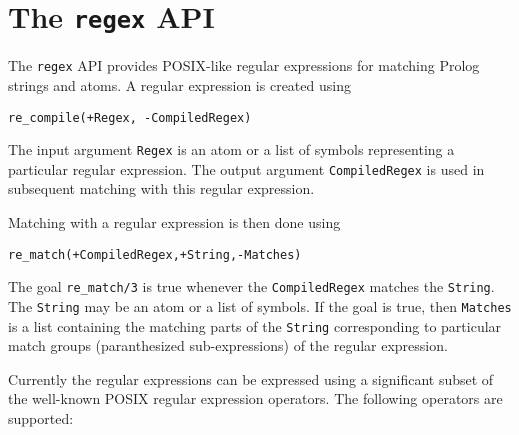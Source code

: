 \documentclass{book}
\begin{document}
\section{The \texttt{regex} API}
\label{sec:regex}

The \texttt{regex} API provides POSIX-like regular expressions for
matching Prolog strings and atoms. A regular expression is created
using
\begin{verbatim}
re_compile(+Regex, -CompiledRegex)
\end{verbatim}

The input argument \texttt{Regex} is an atom or a list of symbols
representing a particular regular expression. The output argument
\texttt{CompiledRegex} is used in subsequent matching with this 
regular expression.

Matching with a regular expression is then done using
\begin{verbatim}
re_match(+CompiledRegex,+String,-Matches)
\end{verbatim}

The goal \texttt{re\_match/3} is true whenever the
\texttt{CompiledRegex} matches the \texttt{String}. The \texttt{String} may be 
an atom or a list of symbols. If the goal is true, then
\texttt{Matches} is a list containing the matching parts of the \texttt{String} corresponding to
particular match groups (paranthesized sub-expressions) of the regular expression. 

Currently the regular expressions can be expressed using a
significant subset of the well-known POSIX regular expression
operators. The following operators are supported:
\end{document}

